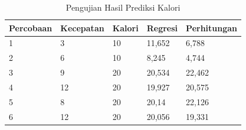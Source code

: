 \begin{table} [ht]
  \caption{Pengujian Hasil Prediksi Kalori}
  \label{tab:PengujianPrediksi}
  \centering
  \begin{tabular}{lllll}
    \toprule
    Percobaan & Kecepatan & Kalori  &  Regresi & Perhitungan \\
    \midrule
    1   & 3     & 10    & 11,652    & 6,788   \\
    2   & 6     & 10    & 8,245     & 4,744   \\
    3   & 9     & 20    & 20,534    & 22,462   \\
    4   & 12    & 20    & 19,927    & 20,575   \\
    5   & 8     & 20    & 20,14     & 22,126   \\
    6   & 12    & 20    & 20,056    & 19,331   \\
    \bottomrule
  \end{tabular}
\end{table}
